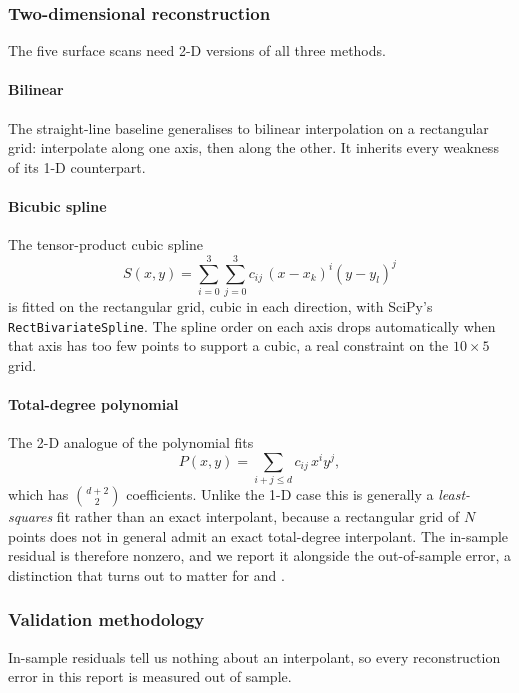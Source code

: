 \documentclass[sigconf,screen,nonacm]{acmart}
\begin{document}
\subsubsection{Two-dimensional reconstruction}

The five surface scans need 2-D versions of all three methods.

\paragraph{Bilinear} The straight-line baseline generalises to bilinear
interpolation on a rectangular grid: interpolate along one axis, then along
the other. It inherits every weakness of its 1-D counterpart.

\paragraph{Bicubic spline} The tensor-product cubic spline
\begin{equation}
S(x,y) = \sum_{i=0}^{3}\sum_{j=0}^{3} c_{ij}\,(x-x_k)^i (y-y_l)^j
\end{equation}
is fitted on the rectangular grid, cubic in each direction, with SciPy's
\texttt{RectBivariateSpline}. The spline order on each axis drops
automatically when that axis has too few points to support a cubic, a real
constraint on the $10\times5$  grid.

\paragraph{Total-degree polynomial} The 2-D analogue of the polynomial fits
\begin{equation}
P(x,y) = \sum_{i+j\leq d} c_{ij}\, x^i y^j,
\end{equation}
which has $\binom{d+2}{2}$ coefficients. Unlike the 1-D case this is
generally a \emph{least-squares} fit rather than an exact interpolant,
because a rectangular grid of $N$ points does not in general admit an exact
total-degree interpolant. The in-sample residual is therefore nonzero, and we
report it alongside the out-of-sample error, a distinction that turns out to
matter for  and .

\subsubsection{Validation methodology}
\label{sec:holdout}

In-sample residuals tell us nothing about an interpolant, so every
reconstruction error in this report is measured out of sample.
\end{document}

